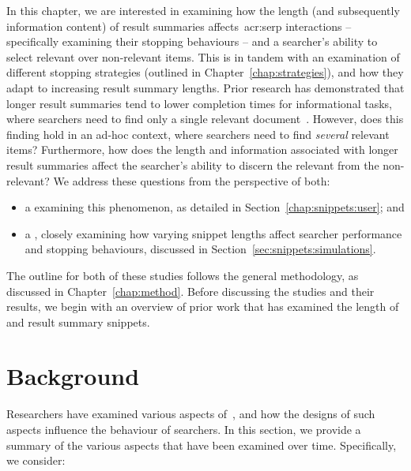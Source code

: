 

In this chapter, we are interested in examining how the length (and subsequently information content) of result summaries affects~\gls{acr:serp} interactions -- specifically examining their stopping behaviours -- and a searcher's ability to select relevant over non-relevant items. This is in tandem with an examination of different stopping strategies (outlined in Chapter~\ref{chap:strategies}), and how they adapt to increasing result summary lengths. Prior research has demonstrated that longer result summaries tend to lower completion times for informational tasks, where searchers need to find only a single relevant document~\citep{cutrell2007eye_tracking}. However, does this finding hold in an ad-hoc context, where searchers need to find \emph{several} relevant items? Furthermore, how does the length and information associated with longer result summaries affect the searcher's ability to discern the relevant from the non-relevant? We address these questions from the perspective of both:

\begin{itemize}
    \item{a  examining this phenomenon, as detailed in Section~\ref{chap:snippets:user}; and}
    \item{a , closely examining how varying snippet lengths affect searcher performance and stopping behaviours, discussed in Section~\ref{sec:snippets:simulations}.}
\end{itemize}

The outline for both of these studies follows the general methodology, as discussed in Chapter~\ref{chap:method}. Before discussing the studies and their results, we begin with an overview of prior work that has examined the length of~ and result summary snippets.

\section{Background}\label{chap:snippets:background}
Researchers have examined various aspects of~, and how the designs of such aspects influence the behaviour of searchers. In this section, we provide a summary of the various aspects that have been examined over time. Specifically, we consider:


